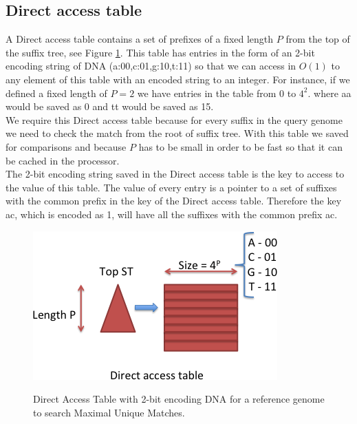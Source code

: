 \documentclass[runningheads,a4paper]{llncs}
\begin{document}
\subsection{Direct access table}
A Direct access table contains a set of prefixes of a fixed length $P$ from the top of the suffix tree, see Figure \ref{fig:dat}. This table has entries in the form of an 2-bit encoding string of DNA (a:00,c:01,g:10,t:11) so that we can access in $O(1)$ to any element of this table with an encoded string to an integer. For instance, if we defined a fixed length of $P=2$ we have entries in the table from 0 to $4^2$. where aa would be saved as 0 and tt would be saved as 15.\\
We require this Direct access table because for every suffix in the query genome we need to check the match from the root of suffix tree. With this table we saved for comparisons and because $P$ has to be small in order to be fast so that it can be cached in the processor.\\
The 2-bit encoding string saved in the Direct access table is the key to access to the value of this table. The value of every entry is a pointer to a set of suffixes with the common prefix in the key of the Direct access table. Therefore the key ac, which is encoded as 1, will have all the suffixes with the common prefix ac.
\begin{figure}
\centering
\includegraphics[scale=0.5]{DAT.png}
\label{fig:dat}
\caption{Direct Access Table with 2-bit encoding DNA for a reference genome to search Maximal Unique Matches.}
\end{figure}
\end{document}
